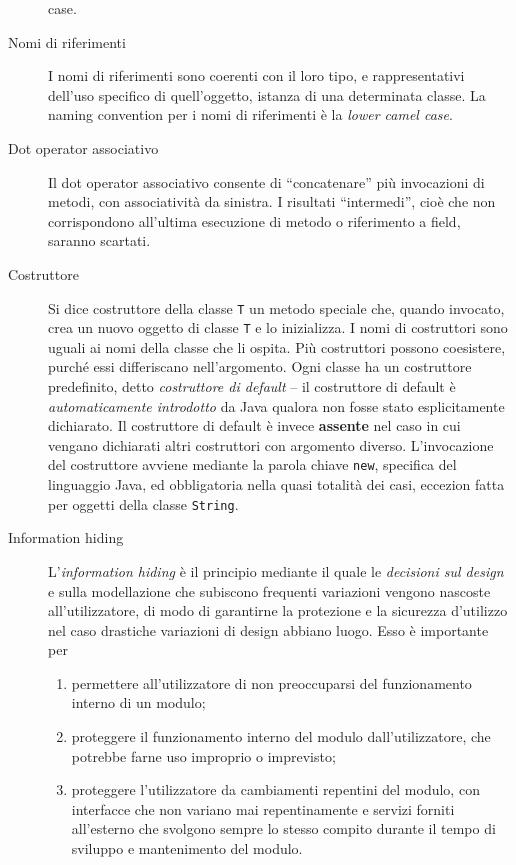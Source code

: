 \documentclass[\fontsizeclass,twocolumn]{\classname}
\theoremstyle{definition}
\theoremstyle{definition}
\begin{document}
\begin{description}
{  case}.
  \item[Nomi di riferimenti] I nomi di riferimenti sono coerenti con il loro
  tipo, e rappresentativi dell'uso specifico di quell'oggetto, istanza di una
  determinata classe. La naming convention per i nomi di riferimenti è la
  \emph{lower camel case}.
  \item[Dot operator associativo] Il dot operator associativo consente di
      ``concatenare'' più invocazioni di metodi, con associatività da sinistra.
      I risultati ``intermedi'', cioè che non corrispondono all'ultima
      esecuzione di metodo o riferimento a field, saranno scartati.
  \item[Costruttore] Si dice costruttore della classe \texttt{T} un metodo
      speciale che, quando invocato, crea un nuovo oggetto di classe \texttt{T}
      e lo inizializza. I nomi di costruttori sono uguali ai nomi della classe
      che li ospita. Più costruttori possono coesistere, purché essi
      differiscano nell'argomento. Ogni classe ha un costruttore predefinito,
      detto \emph{costruttore di default} \--- il costruttore di default è
      \emph{automaticamente introdotto} da Java qualora non fosse stato
      esplicitamente dichiarato. Il costruttore di default è invece
      \textbf{assente} nel caso in cui vengano dichiarati altri costruttori con
      argomento diverso. L'invocazione del costruttore avviene mediante la
      parola chiave \texttt{new}, specifica del linguaggio Java, ed
      obbligatoria nella quasi totalità dei casi, eccezion fatta per oggetti
      della classe \texttt{String}.
  \item[Information hiding] L'\emph{information hiding} è il principio mediante
      il quale le \emph{decisioni sul design} e sulla modellazione che
      subiscono frequenti variazioni vengono nascoste all'utilizzatore, di
      modo di garantirne la protezione e la sicurezza d'utilizzo nel caso
      drastiche variazioni di design abbiano luogo. Esso è importante per
      \begin{enumerate}
          \item permettere all'utilizzatore di non preoccuparsi del
              funzionamento interno di un modulo;
          \item proteggere il funzionamento interno del modulo
              dall'utilizzatore, che potrebbe farne uso improprio o imprevisto;
          \item proteggere l'utilizzatore da cambiamenti repentini del modulo,
              con interfacce che non variano mai repentinamente e servizi
              forniti all'esterno che svolgono sempre lo stesso compito durante
              il tempo di sviluppo e mantenimento del modulo.
      \end{enumerate}
\end{description}
\end{document}
